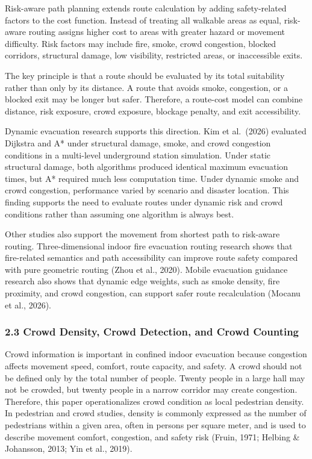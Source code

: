 \documentclass[
]{article}
\begin{document}
Risk-aware path planning extends route calculation by adding
safety-related factors to the cost function. Instead of treating all
walkable areas as equal, risk-aware routing assigns higher cost to areas
with greater hazard or movement difficulty. Risk factors may include
fire, smoke, crowd congestion, blocked corridors, structural damage, low
visibility, restricted areas, or inaccessible exits.

The key principle is that a route should be evaluated by its total
suitability rather than only by its distance. A route that avoids smoke,
congestion, or a blocked exit may be longer but safer. Therefore, a
route-cost model can combine distance, risk exposure, crowd exposure,
blockage penalty, and exit accessibility.

Dynamic evacuation research supports this direction. Kim et al.~(2026)
evaluated Dijkstra and A* under structural damage, smoke, and crowd
congestion conditions in a multi-level underground station simulation.
Under static structural damage, both algorithms produced identical
maximum evacuation times, but A* required much less computation time.
Under dynamic smoke and crowd congestion, performance varied by scenario
and disaster location. This finding supports the need to evaluate routes
under dynamic risk and crowd conditions rather than assuming one
algorithm is always best.

Other studies also support the movement from shortest path to risk-aware
routing. Three-dimensional indoor fire evacuation routing research shows
that fire-related semantics and path accessibility can improve route
safety compared with pure geometric routing (Zhou et al., 2020). Mobile
evacuation guidance research also shows that dynamic edge weights, such
as smoke density, fire proximity, and crowd congestion, can support
safer route recalculation (Mocanu et al., 2026).

\subsubsection{2.3 Crowd Density, Crowd Detection, and Crowd
Counting}\label{crowd-density-crowd-detection-and-crowd-counting}

Crowd information is important in confined indoor evacuation because
congestion affects movement speed, comfort, route capacity, and safety.
A crowd should not be defined only by the total number of people. Twenty
people in a large hall may not be crowded, but twenty people in a narrow
corridor may create congestion. Therefore, this paper operationalizes
crowd condition as local pedestrian density. In pedestrian and crowd
studies, density is commonly expressed as the number of pedestrians
within a given area, often in persons per square meter, and is used to
describe movement comfort, congestion, and safety risk (Fruin, 1971;
Helbing \& Johansson, 2013; Yin et al., 2019).
\end{document}
